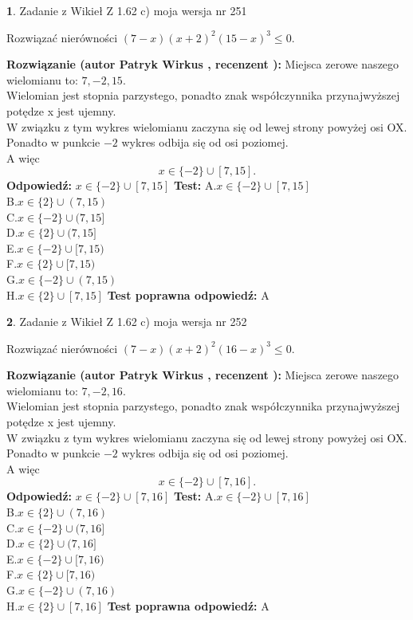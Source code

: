 \documentclass[12pt, a4paper]{article}
\theoremstyle{definition} %
\newtheorem{zad}{}
\newcommand{\zadStart}[1]{\begin{zad}#1\newline}
\newcommand{\zadStop}{\end{zad}}
\newcommand{\rozwStart}[2]{\noindent \textbf{Rozwiązanie (autor #1 , recenzent #2): }\newline}
\newcommand{\rozwStop}{\newline}
\newcommand{\odpStart}{\noindent \textbf{Odpowiedź:}\newline}
\newcommand{\odpStop}{\newline}
\newcommand{\testStart}{\noindent \textbf{Test:}\newline}
\newcommand{\testStop}{\newline}
\newcommand{\kluczStart}{\noindent \textbf{Test poprawna odpowiedź:}\newline}
\newcommand{\kluczStop}{\newline}
\begin{document}
\zadStart{Zadanie z Wikieł Z 1.62 c) moja wersja nr 251}

Rozwiązać nierówności $(7-x)(x+2)^{2}(15-x)^{3}\le0$.
\zadStop
\rozwStart{Patryk Wirkus}{}
Miejsca zerowe naszego wielomianu to: $7, -2, 15$.\\
Wielomian jest stopnia parzystego, ponadto znak współczynnika przy\linebreak najwyższej potędze x jest ujemny.\\ W związku z tym wykres wielomianu zaczyna się od lewej strony powyżej osi OX.\\
Ponadto w punkcie $-2$ wykres odbija się od osi poziomej.\\
A więc $$x \in \{-2\} \cup [7,15].$$
\rozwStop
\odpStart
$x \in \{-2\} \cup [7,15]$
\odpStop
\testStart
A.$x \in \{-2\} \cup [7,15]$\\
B.$x \in \{2\} \cup (7,15)$\\
C.$x \in \{-2\} \cup (7,15]$\\
D.$x \in \{2\} \cup (7,15]$\\
E.$x \in \{-2\} \cup [7,15)$\\
F.$x \in \{2\} \cup [7,15)$\\
G.$x \in \{-2\} \cup (7,15)$\\
H.$x \in \{2\} \cup [7,15]$
\testStop
\kluczStart
A
\kluczStop



\zadStart{Zadanie z Wikieł Z 1.62 c) moja wersja nr 252}

Rozwiązać nierówności $(7-x)(x+2)^{2}(16-x)^{3}\le0$.
\zadStop
\rozwStart{Patryk Wirkus}{}
Miejsca zerowe naszego wielomianu to: $7, -2, 16$.\\
Wielomian jest stopnia parzystego, ponadto znak współczynnika przy\linebreak najwyższej potędze x jest ujemny.\\ W związku z tym wykres wielomianu zaczyna się od lewej strony powyżej osi OX.\\
Ponadto w punkcie $-2$ wykres odbija się od osi poziomej.\\
A więc $$x \in \{-2\} \cup [7,16].$$
\rozwStop
\odpStart
$x \in \{-2\} \cup [7,16]$
\odpStop
\testStart
A.$x \in \{-2\} \cup [7,16]$\\
B.$x \in \{2\} \cup (7,16)$\\
C.$x \in \{-2\} \cup (7,16]$\\
D.$x \in \{2\} \cup (7,16]$\\
E.$x \in \{-2\} \cup [7,16)$\\
F.$x \in \{2\} \cup [7,16)$\\
G.$x \in \{-2\} \cup (7,16)$\\
H.$x \in \{2\} \cup [7,16]$
\testStop
\kluczStart
A
\kluczStop
\end{document}

